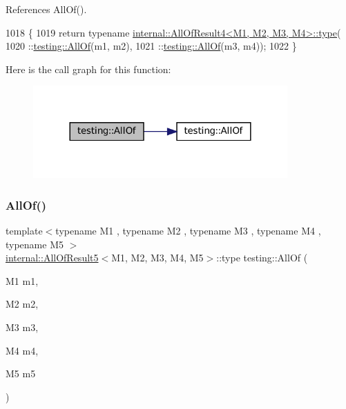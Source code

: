 References All\+Of().


\begin{DoxyCode}
1018                                   \{
1019   \textcolor{keywordflow}{return} \textcolor{keyword}{typename} \hyperlink{namespacegenerate__debs_a50bc9a7ecac9584553e089a448bcde58}{internal::AllOfResult4<M1, M2, M3, M4>::type}(
1020       ::\hyperlink{namespacetesting_af7618e8606c1cb45738163688944e2b7}{testing::AllOf}(m1, m2),
1021       ::\hyperlink{namespacetesting_af7618e8606c1cb45738163688944e2b7}{testing::AllOf}(m3, m4));
1022 \}
\end{DoxyCode}
Here is the call graph for this function\+:
\nopagebreak
\begin{figure}[H]
\begin{center}
\leavevmode
\includegraphics[width=276pt]{namespacetesting_a4a9a119cde16e43b364f3573136857a1_cgraph}
\end{center}
\end{figure}
\mbox{\label{namespacetesting_ab8f5e6cf1c22acf51a2b9b376b0ef03a}} 
\subsubsection{\texorpdfstring{All\+Of()}{AllOf()}\hspace{0.1cm}{\footnotesize\ttfamily [4/9]}}
{\footnotesize\ttfamily template$<$typename M1 , typename M2 , typename M3 , typename M4 , typename M5 $>$ \\
\hyperlink{structtesting_1_1internal_1_1AllOfResult5}{internal\+::\+All\+Of\+Result5}$<$M1, M2, M3, M4, M5$>$\+::type testing\+::\+All\+Of (\begin{DoxyParamCaption}\item[{M1}]{m1,  }\item[{M2}]{m2,  }\item[{M3}]{m3,  }\item[{M4}]{m4,  }\item[{M5}]{m5 }\end{DoxyParamCaption})\hspace{0.3cm}{\ttfamily [inline]}}



